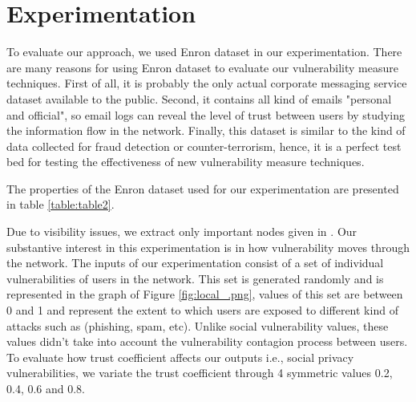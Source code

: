 \section{Experimentation} \label{sec:Experimentation}

To evaluate our approach,
	we used Enron dataset in our experimentation.
There are many reasons for using Enron dataset to evaluate our vulnerability measure techniques.
First of all,
	it is probably the only actual corporate messaging service dataset available to the public.
Second,
	it contains all kind of emails "personal and official",
	so email logs can reveal the level of trust between users by studying the information flow in the network.
Finally,
	this dataset is similar to the kind of data collected for fraud detection or counter-terrorism,
	hence,
	it is a perfect test bed for testing the effectiveness of new vulnerability measure techniques.

The properties of the Enron dataset used for our experimentation are presented in table \ref{table:table2}.




Due to visibility issues,
	we extract only important nodes given in \cite{shetty_discovering_2005}.
Our substantive interest in this experimentation is in how vulnerability moves through the network.
The inputs of our experimentation consist of a set of individual vulnerabilities of users in the network.
This set is generated randomly and is represented in the graph of Figure \ref{fig:local_.png},
	values of this set are between 0 and 1 and represent the extent to which users are exposed to different kind of attacks such as (phishing, spam, etc).
Unlike social vulnerability values,
	these values didn't take into account the vulnerability contagion process between users.
To evaluate how trust coefficient affects our outputs i.e., social privacy vulnerabilities,
	we variate the trust coefficient through 4 symmetric values 0.2, 0.4, 0.6 and 0.8.



